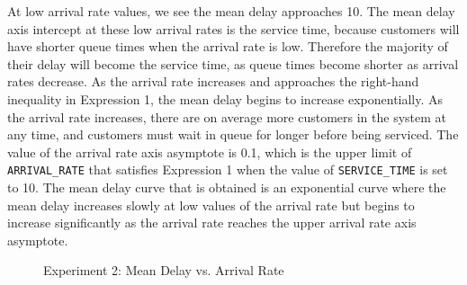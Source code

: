 At low arrival rate values, we see the mean delay approaches 10. The mean delay axis intercept at these low arrival rates is the service time, because customers will have shorter queue times when the arrival rate is low. Therefore the majority of their delay will become the service time, as queue times become shorter as arrival rates decrease.
As the arrival rate increases and approaches the right-hand inequality in Expression 1, the mean delay begins to increase exponentially. As the arrival rate increases, there are on average more customers in the system at any time, and customers must wait in queue for longer before being serviced. The value of the arrival rate axis asymptote is 0.1, which is the upper limit of \texttt{ARRIVAL\_RATE} that satisfies Expression 1 when the value of \texttt{SERVICE\_TIME} is set to 10.
The mean delay curve that is obtained is an exponential curve where the mean delay increases slowly at low values of the arrival rate but begins to increase significantly as the arrival rate reaches the upper arrival rate axis asymptote.

\begin{figure}[h]
\centering
{}
\caption{Experiment 2: Mean Delay vs. Arrival Rate}
\label{fig:exp2}
\end{figure}